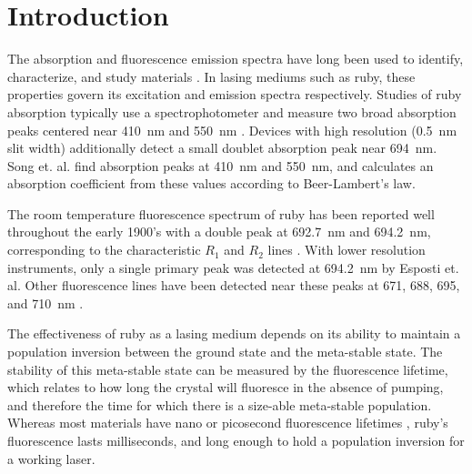 \documentclass[11pt, a4paper, twocolumn]{article}
\begin{document}

\twocolumn[
  \begin{@twocolumnfalse}
    \maketitle
    \begin{abstract}
      \abstractText
      \newline
      \newline
    \end{abstract}
  \end{@twocolumnfalse}
]


\section*{Introduction}
The absorption and fluorescence emission spectra have long been used to identify, characterize, and study materials \cite{BrittanicaSpectroscopy}. In lasing mediums such as ruby, these properties govern its excitation and emission spectra respectively. Studies of ruby absorption typically use a spectrophotometer and measure two broad absorption peaks centered near \SI{410}{\nm} and \SI{550}{\nm} \cite{Esposti,Kusuma,Song}. Devices with high resolution (\SI{0.5}{\nm} slit width) additionally detect a small doublet absorption peak near \SI{694}{\nm}. Song et. al. find absorption peaks at \SI{410}{\nm} and \SI{550}{\nm}, and calculates an absorption coefficient from these values according to Beer-Lambert's law.

The room temperature fluorescence spectrum of ruby has been reported well throughout the early 1900's with a double peak at \SI{692.7}{\nm} and \SI{694.2}{\nm}, corresponding to the characteristic $R_1$ and $R_2$ lines \cite{Kumari, Mani}. With lower resolution instruments, only a single primary peak was detected at \SI{694.2}{\nm} by Esposti et. al. Other fluorescence lines have been detected near these peaks at 671, 688, 695, and \SI{710}{\nm} \cite{Kusuma}.

The effectiveness of ruby as a lasing medium depends on its ability to maintain a population inversion between the ground state and the meta-stable state. The stability of this meta-stable state can be measured by the fluorescence lifetime, which relates to how long the crystal will fluoresce in the absence of pumping, and therefore the time for which there is a size-able meta-stable population. Whereas most materials have nano or picosecond fluorescence lifetimes \cite{Berezin}, ruby’s fluorescence lasts milliseconds, and long enough to hold a population inversion for a working laser.
\end{document}

